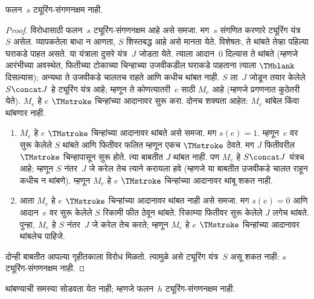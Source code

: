 \documentclass[../../../include/open-logic-section]{subfiles}
\begin{document}
\begin{lem}
फलन~$s$ ट्यूरिंग-संगणनक्षम नाही.
\end{lem}

\begin{proof}
विरोधासाठी फलन~$s$ ट्यूरिंग-संगणनक्षम आहे असे
समजा. मग~$s$ संगणित करणारे ट्यूरिंग यंत्र~$S$
असेल. व्यापकतेला बाधा न आणता, $S$ शिस्तबद्ध
आहे असे मानता येते. विशेषतः, ते थांबते
तेव्हा पहिल्या घराकडे पाहत असते.
या यंत्राला दुसरे यंत्र~$J$ जोडता येते.
त्याला आदान~$0$ दिल्यास ते थांबते
(म्हणजे आरंभीच्या अवस्थेत, फितीच्या टोकाच्या
चिन्हाच्या उजवीकडील घराकडे पाहताना त्याला
$\TMblank$ दिसल्यास); अन्यथा ते उजवीकडे
चालतच राहते आणि कधीच थांबत नाही.
$S$ ला~$J$ जोडून तयार केलेले
$S \concat J$ हे ट्यूरिंग यंत्र आहे;
म्हणून ते कोणत्यातरी~$e$ साठी $M_e$
आहे (म्हणजे प्रगणनात कुठेतरी येते).
$M_e$ हे $e$ $\TMstroke$ चिन्हांच्या
आदानावर सुरू करा. दोनच शक्यता आहेत:
$M_e$ थांबेल किंवा थांबणार नाही.
\begin{enumerate}
\item $M_e$ हे $e$ $\TMstroke$ चिन्हांच्या
  आदानावर थांबते असे समजा. मग $s(e)
  = 1$. म्हणून~$e$ वर सुरू केलेले $S$
  थांबते आणि फितीवर फलित म्हणून एकच
  $\TMstroke$ ठेवते. मग $J$ फितीवरील
  $\TMstroke$ चिन्हापासून सुरू होते. त्या
  बाबतीत $J$ थांबत नाही. पण $M_e$ हे
  $S \concat J$ यंत्रच आहे; म्हणून $S$
  नंतर~$J$ जे करेल तेच त्याने करायला
  हवे (म्हणजे या बाबतीत उजवीकडे चालत
  राहून कधीच न थांबणे). म्हणून $M_e$
  हे $e$ $\TMstroke$ चिन्हांच्या आदानावर
  थांबू शकत नाही.

\item आता $M_e$ हे $e$ $\TMstroke$
  चिन्हांच्या आदानावर थांबत नाही असे
  समजा. मग $s(e) = 0$ आणि आदान~$e$
  वर सुरू केलेले $S$ रिकामी फीत ठेवून
  थांबते. रिकाम्या फितीवर सुरू केलेले
  $J$ लगेच थांबते. पुन्हा, $M_e$ हे
  $S$ नंतर~$J$ जे करेल तेच करते;
  म्हणून $M_e$ हे $e$ $\TMstroke$
  चिन्हांच्या आदानावर थांबलेच पाहिजे.
\end{enumerate}
दोन्ही बाबतीत आपल्या गृहीतकाला विरोध
मिळतो. त्यामुळे असे ट्यूरिंग यंत्र~$S$
असू शकत नाही: $s$ ट्यूरिंग-संगणनक्षम नाही.
\end{proof}

\begin{thm}
 थांबण्याची समस्या
सोडवता येत नाही; म्हणजे फलन~$h$
ट्यूरिंग-संगणनक्षम नाही.
\end{thm}
\end{document}
